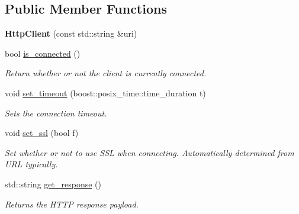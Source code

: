 \subsection*{Public Member Functions}
\begin{DoxyCompactItemize}
\item 
\mbox{\label{class_vessel_1_1_networking_1_1_http_client_aa71e7a5b4db62ae2a71e058145f6160e}} 
{\bfseries Http\+Client} (const std\+::string \&uri)
\item 
bool \hyperlink{class_vessel_1_1_networking_1_1_http_client_a36f814eda4b6b35e2e6991bbd0f8f672}{is\+\_\+connected} ()
\begin{DoxyCompactList}\small\item\em Return whether or not the client is currently connected. \end{DoxyCompactList}\item 
\mbox{\label{class_vessel_1_1_networking_1_1_http_client_aa1a40ba8a7c7d6b6ff684fae7f431860}} 
void \hyperlink{class_vessel_1_1_networking_1_1_http_client_aa1a40ba8a7c7d6b6ff684fae7f431860}{set\+\_\+timeout} (boost\+::posix\+\_\+time\+::time\+\_\+duration t)
\begin{DoxyCompactList}\small\item\em Sets the connection timeout. \end{DoxyCompactList}\item 
\mbox{\label{class_vessel_1_1_networking_1_1_http_client_aca87333d6add0bd783183092eaa2d552}} 
void \hyperlink{class_vessel_1_1_networking_1_1_http_client_aca87333d6add0bd783183092eaa2d552}{set\+\_\+ssl} (bool f)
\begin{DoxyCompactList}\small\item\em Set whether or not to use S\+SL when connecting. Automatically determined from U\+RL typically. \end{DoxyCompactList}\item 
std\+::string \hyperlink{class_vessel_1_1_networking_1_1_http_client_a55ce6fc94f87558d5d93f71ddbf86849}{get\+\_\+response} ()
\begin{DoxyCompactList}\small\item\em Returns the H\+T\+TP response payload. \end{DoxyCompactList}\item 

\end{DoxyCompactItemize}
